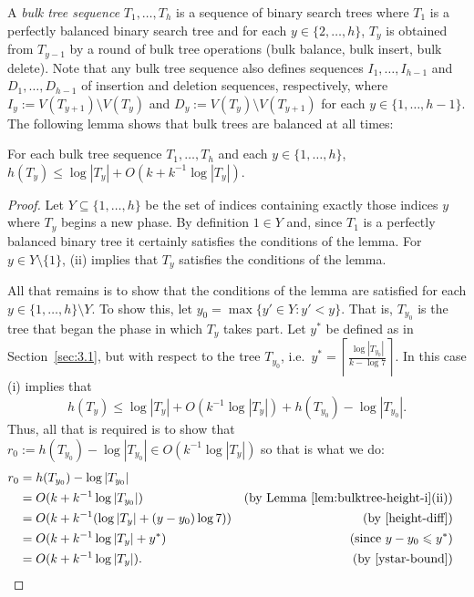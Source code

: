\documentclass[kpfonts]{patmorin}
\let\le\leqslant
\begin{document}
A \emph{bulk tree sequence} $T_1,\ldots,T_h$ is a sequence of binary search trees where $T_1$ is a perfectly balanced binary search tree and for each $y\in\{2,\ldots,h\}$, $T_y$ is obtained from $T_{y-1}$ by a round of bulk tree operations (bulk balance, bulk insert, bulk delete).  Note that any bulk tree sequence also defines sequences $I_1,\ldots,I_{h-1}$ and $D_1,\ldots,D_{h-1}$ of insertion and deletion sequences, respectively, where $I_y:=V(T_{y+1})\setminus V(T_y)$ and $D_y:=V(T_{y})\setminus V(T_{y+1})$ for each $y\in\{1,\ldots,h-1\}$. 
The following lemma shows that bulk trees are balanced at all times:
\begin{lem}
  For each bulk tree sequence $T_1,\ldots,T_h$ and each $y\in\{1,\ldots,h\}$,  $h(T_y)\le \log|T_y| + O(k+k^{-1}\log|T_y|)$.
\end{lem}

\begin{proof}
  Let $Y\subseteq\{1,\ldots,h\}$ be the set of indices containing exactly those indices $y$ where $T_y$ begins a new phase. By definition $1\in Y$ and, since $T_1$ is a perfectly balanced binary tree it certainly satisfies the conditions of the lemma.  For $y\in Y\setminus\{1\}$, 
  (ii) implies that $T_y$ satisfies the conditions of the lemma.  
  
  All that remains is to show that the conditions of the lemma are satisfied for each $y\in\{1,\ldots,h\}\setminus Y$. To show this, let $y_0=\max\{ y'\in Y: y'<y\}$.  That is, $T_{y_0}$ is the tree that began the phase in which $T_y$ takes part.  Let $y^*$ be defined as in Section~\ref{sec:3.1}, but with respect to the tree $T_{y_0}$, i.e.\ $y^*=\left\lceil\tfrac{\log |T_{y_0}|}{k-\log 7}\right\rceil$.
  In this case (i) implies that
  \[  h(T_y) \le \log |T_y| + O(k^{-1}\log |T_y|) + h(T_{y_0})-\log|T_{y_0}|.\]  
  Thus, all that is required is to show that $r_0:=h(T_{y_0})-\log|T_{y_0}|\in O(k^{-1}\log|T_y|)$ so that is what we do:
  \begin{align*}
    r_0 &= h(T_{y_0})-\log|T_{y_0}| \\
       &= O(k + k^{-1}\log|T_{y_0}|) 
        & \text{(by \lemref{bulktree-height-i}(ii))}\\
       &= O(k + k^{-1}(\log|T_{y}| + (y-y_0)\log7)) 
        & \text{(by \eqref{height-diff})} \\
       &= O(k + k^{-1}\log|T_{y}| + y^*) 
        & \text{(since $y-y_0 \le y^*$)} \\
       &= O(k + k^{-1}\log|T_{y}|). & \text{(by \eqref{ystar-bound})} & \qedhere
  \end{align*}
\end{proof}
\end{document}
